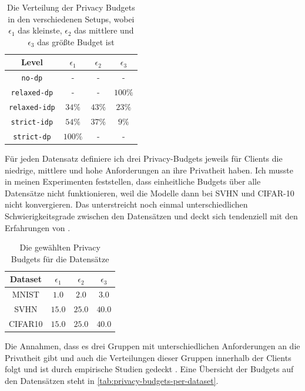 \begin{table}[tb]
	\centering
	\begin{tabular}{cccc}
		\toprule
		Level & $\epsilon_1$ & $\epsilon_2$ & $\epsilon_3$ \\
		\midrule
		\texttt{no-dp} & - & - & - \\
		\texttt{relaxed-dp} & - & - & $100\%$ \\
		\texttt{relaxed-idp} & $34\%$ & $43\%$ & $23\%$ \\
		\texttt{strict-idp} & $54\%$ & $37\%$ & $9\%$ \\
		\texttt{strict-dp} & $100\%$ & - & - \\
		\bottomrule
	\end{tabular}
	\caption{Die Verteilung der Privacy Budgets in den verschiedenen Setups, wobei $\epsilon_1$ das kleinste, $\epsilon_2$ das mittlere und $\epsilon_3$ das größte Budget ist}
	\label{tab:privacy-niveau-distribution}
\end{table}

Für jeden Datensatz definiere ich drei Privacy-Budgets jeweils für Clients die niedrige, mittlere und hohe Anforderungen an ihre Privatheit haben. Ich musste in meinen Experimenten feststellen, dass einheitliche Budgets über alle Datensätze nicht funktionieren, weil die Modelle dann bei SVHN und CIFAR-10 nicht konvergieren. Das unterstreicht noch einmal unterschiedlichen Schwierigkeitsgrade zwischen den Datensätzen und deckt sich tendenziell mit den Erfahrungen von \textcite{sun:2021}.

\begin{table}[tb]
	\centering
	\begin{tabular}{cccc}
		\toprule
		Dataset & $\epsilon_1$ & $\epsilon_2$ & $\epsilon_3$ \\
		\midrule
		MNIST & $1.0$ & $2.0$ & $3.0$ \\
		SVHN & $15.0$ & $25.0$ & $40.0$ \\
		CIFAR10 & $15.0$ & $25.0$ & $40.0$ \\
		\bottomrule
	\end{tabular}
	\caption{Die gewählten Privacy Budgets für die Datensätze}
	\label{tab:privacy-budgets-per-dataset}
\end{table}

Die Annahmen, dass es drei Gruppen mit unterschiedlichen Anforderungen an die Privatheit gibt und auch die Verteilungen dieser Gruppen innerhalb der Clients folgt \textcite{boenisch:2023} und ist durch empirische Studien gedeckt \cite{jensen:2005, acquisti:2005}. Eine Übersicht der Budgets auf den Datensätzen steht in \autoref{tab:privacy-budgets-per-dataset}.

